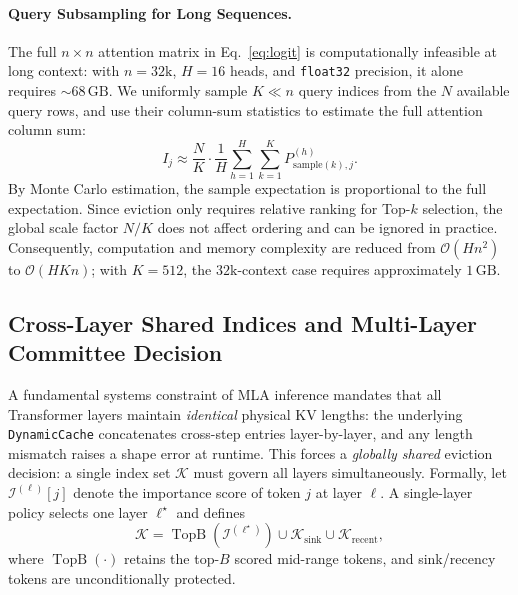 \documentclass[letterpaper]{article} %
\begin{document}
\paragraph{Query Subsampling for Long Sequences.}
The full $n \times n$ attention matrix in Eq.~\eqref{eq:logit} is
computationally infeasible at long context: with $n = 32\text{k}$,
$H = 16$ heads, and \texttt{float32} precision, it alone requires
${\sim}68\,\text{GB}$.
We uniformly sample $K \ll n$ query indices
from the $N$ available query rows, and use their column-sum statistics to
estimate the full attention column sum:
\begin{equation}
  I_j \approx \frac{N}{K}\cdot
  \frac{1}{H}\sum_{h=1}^{H}\sum_{k=1}^{K} P_{\mathrm{sample}(k),j}^{(h)}.
  \label{eq:sampled}
\end{equation}
By Monte Carlo estimation, the sample expectation is proportional to the full
expectation. Since eviction only requires relative ranking for Top-$k$
selection, the global scale factor $N/K$ does not affect ordering and can be
ignored in practice.
Consequently, computation and memory complexity are reduced from
$\mathcal{O}(Hn^2)$ to $\mathcal{O}(HKn)$;
with $K{=}512$, the $32\text{k}$-context case requires approximately $1\,\text{GB}$.






\subsection{Cross-Layer Shared Indices and Multi-Layer Committee Decision}

A fundamental systems constraint of MLA inference mandates that all Transformer
layers maintain \emph{identical} physical KV lengths: the underlying
\texttt{DynamicCache} concatenates cross-step entries layer-by-layer, and any
length mismatch raises a shape error at runtime. This forces a
\emph{globally shared} eviction decision: a single index set $\mathcal{K}$
must govern all layers simultaneously. Formally, let $\mathcal{I}^{(\ell)}[j]$
denote the importance score of token $j$ at layer $\ell$. A single-layer policy
selects one layer $\ell^{\star}$ and defines
\begin{equation}
  \mathcal{K}
  = \operatorname{TopB}\!\left(\mathcal{I}^{(\ell^{\star})}\right)
    \cup \mathcal{K}_{\mathrm{sink}} \cup \mathcal{K}_{\mathrm{recent}},
\end{equation}
where $\operatorname{TopB}(\cdot)$ retains the top-$B$ scored mid-range tokens,
and sink/recency tokens are unconditionally protected.
\end{document}

